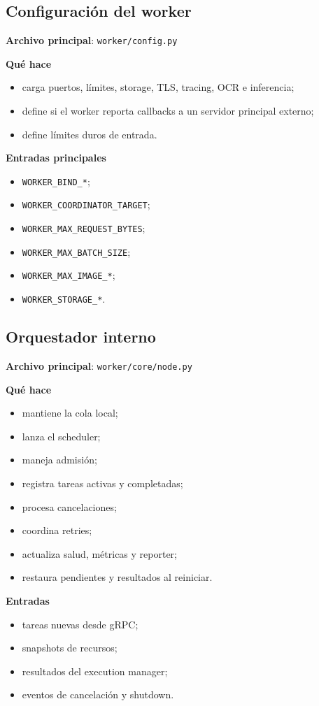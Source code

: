 \documentclass[11pt]{article}
\begin{document}
\subsection{Configuración del worker}
\textbf{Archivo principal}: \texttt{worker/config.py}

\textbf{Qué hace}
\begin{itemize}
\item carga puertos, límites, storage, TLS, tracing, OCR e inferencia;
\item define si el worker reporta callbacks a un servidor principal externo;
\item define límites duros de entrada.
\end{itemize}

\textbf{Entradas principales}
\begin{itemize}
\item \texttt{WORKER\_BIND\_*};
\item \texttt{WORKER\_COORDINATOR\_TARGET};
\item \texttt{WORKER\_MAX\_REQUEST\_BYTES};
\item \texttt{WORKER\_MAX\_BATCH\_SIZE};
\item \texttt{WORKER\_MAX\_IMAGE\_*};
\item \texttt{WORKER\_STORAGE\_*}.
\end{itemize}

\subsection{Orquestador interno}
\textbf{Archivo principal}: \texttt{worker/core/node.py}

\textbf{Qué hace}
\begin{itemize}
\item mantiene la cola local;
\item lanza el scheduler;
\item maneja admisión;
\item registra tareas activas y completadas;
\item procesa cancelaciones;
\item coordina retries;
\item actualiza salud, métricas y reporter;
\item restaura pendientes y resultados al reiniciar.
\end{itemize}

\textbf{Entradas}
\begin{itemize}
\item tareas nuevas desde gRPC;
\item snapshots de recursos;
\item resultados del execution manager;
\item eventos de cancelación y shutdown.
\end{itemize}
\end{document}
